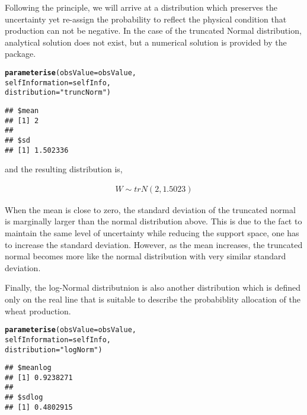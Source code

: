 \documentclass[nojss]{jss}\usepackage[]{graphicx}\usepackage[]{color}
\makeatletter
\newcommand{\hlstr}[1]{\textcolor[rgb]{0.192,0.494,0.8}{#1}}%
\newcommand{\hlstd}[1]{\textcolor[rgb]{0.345,0.345,0.345}{#1}}%
\newcommand{\hlkwc}[1]{\textcolor[rgb]{0.333,0.667,0.333}{#1}}%
\newcommand{\hlkwd}[1]{\textcolor[rgb]{0.737,0.353,0.396}{\textbf{#1}}}%
\newenvironment{kframe}{%
 \def\at@end@of@kframe{}%
 \ifinner\ifhmode%
  \def\at@end@of@kframe{\end{minipage}}%
  \begin{minipage}{\columnwidth}%
 \fi\fi%
 \def\FrameCommand##1{\hskip\@totalleftmargin \hskip-\fboxsep
 \colorbox{shadecolor}{##1}\hskip-\fboxsep
     \hskip-\linewidth \hskip-\@totalleftmargin \hskip\columnwidth}%
 \MakeFramed {\advance\hsize-\width
   \@totalleftmargin\z@ \linewidth\hsize
   \@setminipage}}%
 {\par\unskip\endMakeFramed%
 \at@end@of@kframe}
\newenvironment{knitrout}{}{} %
\makeatother
\begin{document}
Following the principle, we will arrive at a distribution which
preserves the uncertainty yet re-assign the probability to reflect the
physical condition that production can not be negative. In the case of
the truncated Normal distribution, analytical solution does not exist,
but a numerical solution is provided by the package.


\begin{knitrout}
\color{fgcolor}\begin{kframe}
\begin{alltt}
\hlkwd{parameterise}\hlstd{(}\hlkwc{obsValue} \hlstd{= obsValue,}
             \hlkwc{selfInformation} \hlstd{= selfInfo,}
             \hlkwc{distribution} \hlstd{=} \hlstr{"truncNorm"}\hlstd{)}
\end{alltt}
\begin{verbatim}
## $mean
## [1] 2
## 
## $sd
## [1] 1.502336
\end{verbatim}
\end{kframe}
\end{knitrout}

and the resulting distribution is,


\begin{align}
  W \sim trN(2, 1.5023)\nonumber
\end{align}

When the mean is close to zero, the standard deviation of the
truncated normal is marginally larger than the normal distribution
above. This is due to the fact to maintain the same level of
uncertainty while reducing the support space, one has to increase the
standard deviation. However, as the mean increases, the truncated
normal becomes more like the normal distribution with very similar
standard deviation.

Finally, the log-Normal distributnion is also another distribution
which is defined only on the real line that is suitable to describe
the probabiblity allocation of the wheat production.


\begin{knitrout}
\color{fgcolor}\begin{kframe}
\begin{alltt}
\hlkwd{parameterise}\hlstd{(}\hlkwc{obsValue} \hlstd{= obsValue,}
             \hlkwc{selfInformation} \hlstd{= selfInfo,}
             \hlkwc{distribution} \hlstd{=} \hlstr{"logNorm"}\hlstd{)}
\end{alltt}
\begin{verbatim}
## $meanlog
## [1] 0.9238271
## 
## $sdlog
## [1] 0.4802915
\end{verbatim}
\end{kframe}
\end{knitrout}
\end{document}
